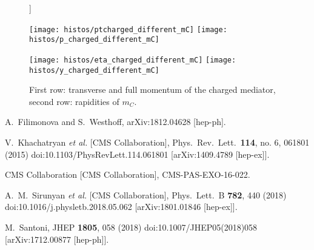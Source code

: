 \documentclass[10pt,letterpaper,notitlepage]{article}
\begin{document}
\begin{figure}[[H]]
\centering

\texttt{[image: histos/ptcharged\_different\_mC]}
\texttt{[image: histos/p\_charged\_different\_mC]}

\texttt{[image: histos/eta\_charged\_different\_mC]}
\texttt{[image: histos/y\_charged\_different\_mC]}

\caption{\label{fig:charged-kin}First row: transverse and full momentum of the charged mediator, second row: rapidities of $m_C$.}
\end{figure}

\begin{thebibliography}{6}

  A.~Filimonova and S.~Westhoff,
  arXiv:1812.04628 [hep-ph].

    V.~Khachatryan {\it et al.} [CMS Collaboration],
    Phys.\ Rev.\ Lett.\  {\bf 114}, no. 6, 061801 (2015)
    doi:10.1103/PhysRevLett.114.061801
    [arXiv:1409.4789 [hep-ex]].


    CMS Collaboration [CMS Collaboration],
    CMS-PAS-EXO-16-022.

  A.~M.~Sirunyan {\it et al.} [CMS Collaboration],
  Phys.\ Lett.\ B {\bf 782}, 440 (2018)
  doi:10.1016/j.physletb.2018.05.062
  [arXiv:1801.01846 [hep-ex]].

    M.~Santoni,
    JHEP {\bf 1805}, 058 (2018)
    doi:10.1007/JHEP05(2018)058
    [arXiv:1712.00877 [hep-ph]].

\end{thebibliography}
\end{document}
